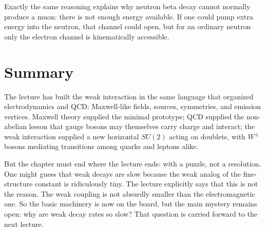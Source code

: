 Exactly the same reasoning explains why neutron beta decay cannot normally produce a muon: there is not enough energy available. If one could pump extra energy into the neutron, that channel could open, but for an ordinary neutron only the electron channel is kinematically accessible.

\section{Summary}

The lecture has built the weak interaction in the same language that organized electrodynamics and QCD: Maxwell-like fields, sources, symmetries, and emission vertices. Maxwell theory supplied the minimal prototype; QCD supplied the non-abelian lesson that gauge bosons may themselves carry charge and interact; the weak interaction supplied a new horizontal \(SU(2)\) acting on doublets, with \(W^\pm\) bosons mediating transitions among quarks and leptons alike.

But the chapter must end where the lecture ends: with a puzzle, not a resolution. One might guess that weak decays are slow because the weak analog of the fine-structure constant is ridiculously tiny. The lecture explicitly says that this is not the reason. The weak coupling is not absurdly smaller than the electromagnetic one. So the basic machinery is now on the board, but the main mystery remains open: why are weak decay rates so slow? That question is carried forward to the next lecture.